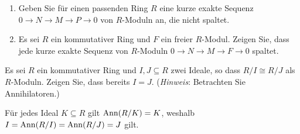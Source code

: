 \begin{question}
  \begin{enumerate}
    \item
      Geben Sie für einen passenden Ring $R$ eine kurze exakte Sequenz $0 \to N \to M \to P \to 0$ von $R$-Moduln an, die nicht spaltet.
    \item
      Es sei $R$ ein kommutativer Ring und $F$ ein freier $R$-Modul.
      Zeigen Sie, dass jede kurze exakte Sequenz von $R$-Moduln $0 \to N \to M \to F \to 0$ spaltet.
  \end{enumerate}
\end{question}




\begin{question}
  Es sei $R$ ein kommutativer Ring und $I, J \subseteq R$ zwei Ideale, so dass $R/I \cong R/J$ als $R$-Moduln.
  Zeigen Sie, dass bereits $I = J$.
  (\emph{Hinweis}:
   Betrachten Sie Annihilatoren.)
\end{question}


\begin{solution}
  Für jedes Ideal $K \subseteq R$ gilt $\operatorname{Ann}(R/K) = K$, weshalb $I = \operatorname{Ann}(R/I) = \operatorname{Ann}(R/J) = J$ gilt.
\end{solution}



